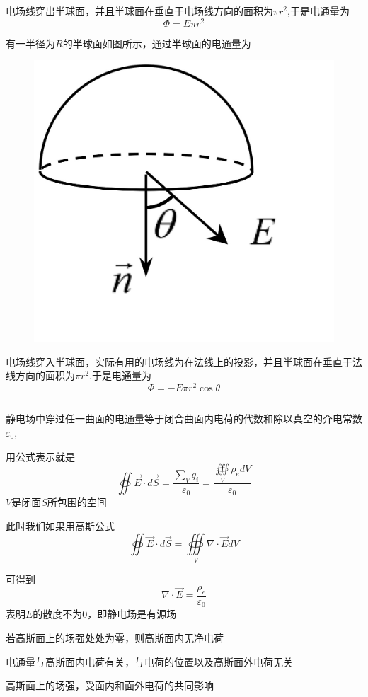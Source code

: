 \documentclass[lang=cn,10pt]{elegantbook}
\begin{document}
		\begin{solution}
			电场线穿出半球面，并且半球面在垂直于电场线方向的面积为$\pi r^{2}$,于是电通量为
			\begin{equation*}
				\varPhi=E\pi r^{2}
			\end{equation*}
		\end{solution}
		\begin{example}
			有一半径为$R$的半球面如图所示，通过半球面的电通量为
\begin{figure}[H]
	\centering
	\includegraphics[width=0.18\linewidth]{image/IMG_0414(20231116-202133)}
	\caption{}
	\label{fig:img041420231116-202133}
\end{figure}
		\end{example}
		\begin{solution}
			电场线穿入半球面，实际有用的电场线为在法线上的投影，并且半球面在垂直于法线方向的面积为$\pi r^{2}$,于是电通量为
			\begin{equation*}
				\varPhi=-E\pi r^{2}
				\cos\theta
			\end{equation*}
		\end{solution}
		\subsection{\color{red} }
		\begin{theorem}[高斯定理]
			静电场中穿过任一曲面的电通量等于闭合曲面内电荷的代数和除以真空的介电常数$\varepsilon_{0}$,
			
			用公式表示就是
			\begin{equation*}
				\oiint{\overrightarrow{E}\cdot d\overrightarrow{S}}=\frac{\sum_V{q_i}}{\varepsilon _0}=\frac{\oiiint\limits_V{\rho _edV}}{\varepsilon _0}
			\end{equation*}
			$V$是闭面$S$所包围的空间
		\end{theorem}
		\begin{note}
			此时我们如果用高斯公式
			\begin{equation*}
				\oiint{\overrightarrow{E}\cdot d\overrightarrow{S}}=\oiiint\limits_V{\nabla \cdot \overrightarrow{E}dV}
			\end{equation*}
			
			可得到
			\begin{equation*}
				\nabla \cdot \overrightarrow{E}=\frac{\rho _e}{\varepsilon _0}
			\end{equation*}
			表明$E$的散度不为0，即静电场是有源场
		\end{note}
		\begin{remark}
			若高斯面上的场强处处为零，则高斯面内无净电荷
		\end{remark}
		\begin{remark}
			电通量与高斯面内电荷有关，与电荷的位置以及高斯面外电荷无关
		\end{remark}
		\begin{remark}
			高斯面上的场强，受面内和面外电荷的共同影响
		\end{remark}
		
\end{document}
